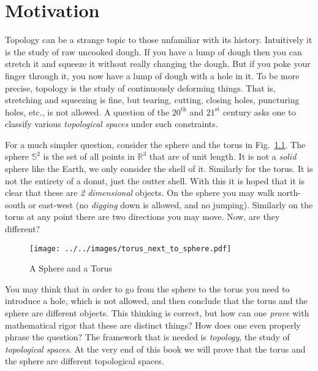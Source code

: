 \chapter{Motivation}
    Topology can be a strange topic to those unfamiliar with its history.
    Intuitively it is the study of raw uncooked dough. If you have a lump of
    dough then you can stretch it and squeeze it without really changing the
    dough. But if you poke your finger through it, you now have a lump of dough
    with a hole in it. To be more precise, topology is the study of continuously
    deforming things. That is, stretching and squeezing is fine, but tearing,
    cutting, closing holes, puncturing holes, etc., is not allowed. A question
    of the $20^{\textrm{th}}$ and $21^{\textrm{st}}$ century asks one to
    classify various \textit{topological spaces} under such constraints.
    \par\hfill\par
    For a much simpler question, consider the sphere and the torus in
    Fig.~\ref{fig:sphere_and_torus}. The sphere $\mathbb{S}^{2}$ is the set of
    all points in $\mathbb{R}^{3}$ that are of unit length. It is not a
    \textit{solid} sphere like the Earth, we only consider the shell of it.
    Similarly for the torus. It is not the entirety of a donut, just the outter
    shell. With this it is hoped that it is clear that these are
    \textit{2 dimensional} objects. On the sphere you may walk north-south or
    east-west (no \textit{digging} down is allowed, and no jumping). Similarly
    on the torus at any point there are two directions you may move. Now,
    are they different?
    \begin{figure}[H]
        \centering
        \texttt{[image: ../../images/torus\_next\_to\_sphere.pdf]}
        \caption{A Sphere and a Torus}
        \label{fig:sphere_and_torus}
    \end{figure}
    You may think that in order to go from the sphere to the torus you need to
    introduce a hole, which is not allowed, and then conclude that the torus
    and the sphere are different objects. This thinking is correct,
    but how can one \textit{prove} with mathematical rigor that these are
    distinct things? How does one even properly phrase the question? The
    framework that is needed is \textit{topology}, the study of
    \textit{topological spaces}. At the very end of this book we will prove that
    the torus and the sphere are different topological spaces.
    \par\hfill\par

